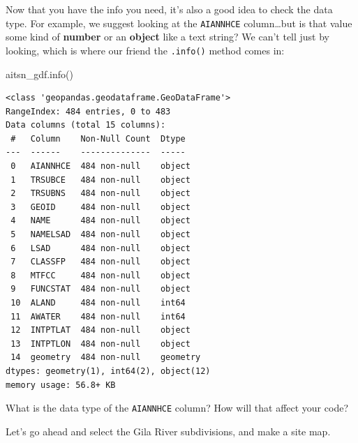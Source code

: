 \documentclass[
  letterpaper,
  DIV=11,
  numbers=noendperiod,
  oneside]{scrreprt}
\newenvironment{Shaded}{\begin{snugshade}}{\end{snugshade}}
\newcommand{\NormalTok}[1]{\textcolor[rgb]{0.00,0.23,0.31}{#1}}
\begin{document}
Now that you have the info you need, it's also a good idea to check the
data type. For example, we suggest looking at the \texttt{AIANNHCE}
column\ldots but is that value some kind of \textbf{number} or an
\textbf{object} like a text string? We can't tell just by looking, which
is where our friend the \texttt{.info()} method comes in:

\begin{Shaded}
\begin{Highlighting}[]
\NormalTok{aitsn\_gdf.info()}
\end{Highlighting}
\end{Shaded}

\begin{verbatim}
<class 'geopandas.geodataframe.GeoDataFrame'>
RangeIndex: 484 entries, 0 to 483
Data columns (total 15 columns):
 #   Column    Non-Null Count  Dtype   
---  ------    --------------  -----   
 0   AIANNHCE  484 non-null    object  
 1   TRSUBCE   484 non-null    object  
 2   TRSUBNS   484 non-null    object  
 3   GEOID     484 non-null    object  
 4   NAME      484 non-null    object  
 5   NAMELSAD  484 non-null    object  
 6   LSAD      484 non-null    object  
 7   CLASSFP   484 non-null    object  
 8   MTFCC     484 non-null    object  
 9   FUNCSTAT  484 non-null    object  
 10  ALAND     484 non-null    int64   
 11  AWATER    484 non-null    int64   
 12  INTPTLAT  484 non-null    object  
 13  INTPTLON  484 non-null    object  
 14  geometry  484 non-null    geometry
dtypes: geometry(1), int64(2), object(12)
memory usage: 56.8+ KB
\end{verbatim}

\begin{tcolorbox}[enhanced jigsaw, colbacktitle=quarto-callout-color!10!white, opacityback=0, bottomtitle=1mm, toptitle=1mm, bottomrule=.15mm, left=2mm, colframe=quarto-callout-color-frame, leftrule=.75mm, opacitybacktitle=0.6, colback=white, rightrule=.15mm, toprule=.15mm, breakable, titlerule=0mm, title=\textcolor{quarto-callout-color}{\faInfo}\hspace{0.5em}{Reflect and Respond}, coltitle=black, arc=.35mm]

What is the data type of the \texttt{AIANNHCE} column? How will that
affect your code?

\end{tcolorbox}

Let's go ahead and select the Gila River subdivisions, and make a site
map.
\end{document}
